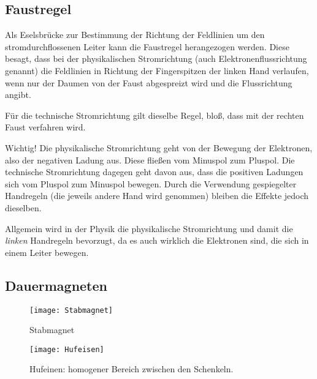 \subsection{Faustregel}	\label{subsec:Faustregel}

Als Eselsbrücke zur Bestimmung der Richtung der Feldlinien um den stromdurchflossenen Leiter kann die \glqq Faustregel\grqq{} herangezogen werden. Diese besagt, dass bei der physikalischen Stromrichtung (auch Elektronenflussrichtung genannt) die Feldlinien in Richtung der Fingerspitzen der linken Hand verlaufen, wenn nur der Daumen von der Faust abgespreizt wird und die Flussrichtung angibt.

Für die technische Stromrichtung gilt dieselbe Regel, bloß, dass mit der rechten Faust verfahren wird.

\begin{leftbar}
	Wichtig! Die physikalische Stromrichtung geht von der Bewegung der Elektronen, also der negativen Ladung aus. Diese fließen vom Minuspol zum Pluspol. Die technische Stromrichtung dagegen geht davon aus, dass die positiven Ladungen sich vom Pluspol zum Minuspol bewegen. Durch die Verwendung gespiegelter Handregeln (die jeweils andere Hand wird genommen) bleiben die Effekte jedoch dieselben. 
	
	Allgemein wird in der Physik die physikalische Stromrichtung und damit die \emph{linken} Handregeln bevorzugt, da es auch wirklich die Elektronen sind, die sich in einem Leiter bewegen.
\end{leftbar}


\newpage

\subsection{Dauermagneten}  	\label{subsec:DauermagnetFeld}


\begin{figure}[H]
	\centering
	\begin{minipage}[b]{0.45\linewidth}
		\centering
    	\texttt{[image: Stabmagnet]}
		\caption{Stabmagnet}
		\label{fig:stab}
	\end{minipage}
	\quad
	\begin{minipage}[b]{0.45\linewidth}
		\centering
    	\texttt{[image: Hufeisen]}
		\caption{Hufeinen: homogener Bereich zwischen den Schenkeln.}
		\label{fig:hufeisen}
	\end{minipage}
\end{figure}


